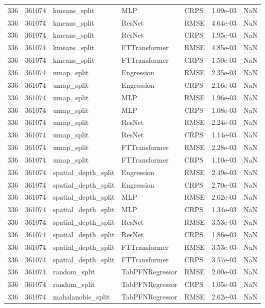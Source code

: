\begin{tabular}{rrlllrr}
336 & 361074 & kmeans\_split & MLP & CRPS & 1.09e-03 & NaN \\
336 & 361074 & kmeans\_split & ResNet & RMSE & 4.64e-03 & NaN \\
336 & 361074 & kmeans\_split & ResNet & CRPS & 1.95e-03 & NaN \\
336 & 361074 & kmeans\_split & FTTransformer & RMSE & 4.85e-03 & NaN \\
336 & 361074 & kmeans\_split & FTTransformer & CRPS & 1.50e-03 & NaN \\
336 & 361074 & umap\_split & Engression & RMSE & 2.35e-03 & NaN \\
336 & 361074 & umap\_split & Engression & CRPS & 2.16e-03 & NaN \\
336 & 361074 & umap\_split & MLP & RMSE & 1.96e-03 & NaN \\
336 & 361074 & umap\_split & MLP & CRPS & 1.08e-03 & NaN \\
336 & 361074 & umap\_split & ResNet & RMSE & 2.24e-03 & NaN \\
336 & 361074 & umap\_split & ResNet & CRPS & 1.14e-03 & NaN \\
336 & 361074 & umap\_split & FTTransformer & RMSE & 2.28e-03 & NaN \\
336 & 361074 & umap\_split & FTTransformer & CRPS & 1.10e-03 & NaN \\
336 & 361074 & spatial\_depth\_split & Engression & RMSE & 2.49e-03 & NaN \\
336 & 361074 & spatial\_depth\_split & Engression & CRPS & 2.70e-03 & NaN \\
336 & 361074 & spatial\_depth\_split & MLP & RMSE & 2.62e-03 & NaN \\
336 & 361074 & spatial\_depth\_split & MLP & CRPS & 1.34e-03 & NaN \\
336 & 361074 & spatial\_depth\_split & ResNet & RMSE & 3.53e-03 & NaN \\
336 & 361074 & spatial\_depth\_split & ResNet & CRPS & 1.86e-03 & NaN \\
336 & 361074 & spatial\_depth\_split & FTTransformer & RMSE & 3.53e-03 & NaN \\
336 & 361074 & spatial\_depth\_split & FTTransformer & CRPS & 3.57e-03 & NaN \\
336 & 361074 & random\_split & TabPFNRegressor & RMSE & 2.00e-03 & NaN \\
336 & 361074 & random\_split & TabPFNRegressor & CRPS & 1.05e-03 & NaN \\
336 & 361074 & mahalanobis\_split & TabPFNRegressor & RMSE & 2.62e-03 & NaN \\

\end{tabular}
